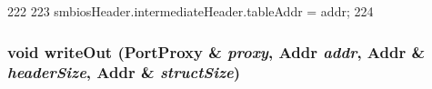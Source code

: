 \begin{DoxyCode}
222     {
223         smbiosHeader.intermediateHeader.tableAddr = addr;
224     }
\end{DoxyCode}
\hypertarget{classX86ISA_1_1SMBios_1_1SMBiosTable_ac061b4f51e0ec5b55cdadd9c58d96da9}{
\subsubsection[{writeOut}]{\setlength{\rightskip}{0pt plus 5cm}void writeOut ({\bf PortProxy} \& {\em proxy}, \/  {\bf Addr} {\em addr}, \/  {\bf Addr} \& {\em headerSize}, \/  {\bf Addr} \& {\em structSize})}}
\label{classX86ISA_1_1SMBios_1_1SMBiosTable_ac061b4f51e0ec5b55cdadd9c58d96da9}



